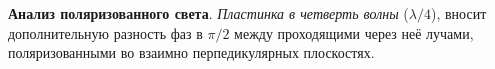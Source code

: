 


\textbf{Анализ поляризованного света}. \textit{Пластинка в четверть волны} ($\lambda/4$), вносит дополнительную разность фаз в $\pi/2$ между проходящими через неё лучами, поляризованными во взаимно перпедикулярных плоскостях. 

